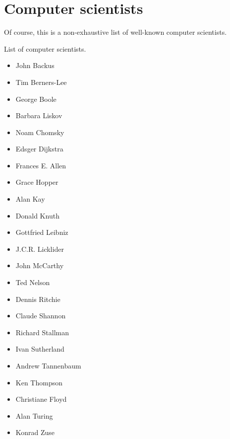 \section{Computer scientists}
%
Of course, this is a non-exhaustive list of well-known computer scientists.

List of computer scientists.

\begin{itemize}
  \item John Backus
  \item Tim Berners-Lee
  \item George Boole
  \item Barbara Liskov
  \item Noam Chomsky
  \item Edsger Dijkstra
  \item Frances E. Allen
  \item Grace Hopper
  \item Alan Kay
  \item Donald Knuth
  \item Gottfried Leibniz
  \item J.C.R. Licklider
  \item John McCarthy
  \item Ted Nelson
  \item Dennis Ritchie
  \item Claude Shannon
  \item Richard Stallman
  \item Ivan Sutherland
  \item Andrew Tannenbaum
  \item Ken Thompson
  \item Christiane Floyd
  \item Alan Turing
  \item Konrad Zuse
\end{itemize}
